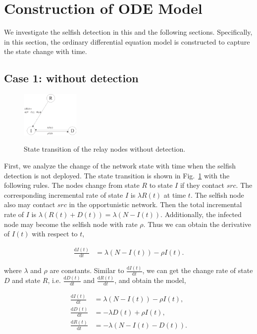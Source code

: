 \section{Construction of ODE Model}
\label{sec:wo_detect}
We investigate the selfish detection in this and the following sections.
Specifically, in this section, the ordinary differential equation model
is constructed to capture the state change with time.
\subsection{Case 1: without detection}
\label{subsec:wo_detc}
\begin{figure}
  \centering
  {\includegraphics[width=0.25\textwidth]
  {fig/state_transition_no_detect.eps}}
     \caption{State transition of the relay nodes without detection.}
     \label{fig:ss_wo_dt}
\end{figure}
First, we analyze the change of the network state with time
when the selfish detection is not deployed.
The state transition is shown
in Fig.~\ref{fig:ss_wo_dt} with the following rules.
The nodes change from state $R$ to state $I$ if they contact $src$.
The corresponding incremental rate of state $I$ is $\lambda R(t)$ at time $t$.
The selfish node also may contact $src$ in the opportunistic network.
Then the total incremental rate of $I$ is
$\lambda (R(t)+D(t))=\lambda (N-I(t))$.
Additionally, the infected node may become the selfish node with rate $\rho$.
Thus we can obtain the derivative of $I(t)$ with respect to $t$,
\begin{small}
\begin{equation}
\nonumber
\begin{aligned}
\frac{\mathrm{d} I(t)}{\mathrm{d} t} &= \lambda (N-I(t)) - \rho I(t).
\end{aligned}
\end{equation}
\end{small}
where $\lambda$ and $\rho$ are constants.
Similar to $\frac{\mathrm{d} I(t)}{\mathrm{d} t}$,
we can get the change rate of state $D$ and state $R$,
i.e. $\frac{\mathrm{d} D(t)}{\mathrm{d} t}$ and
$\frac{\mathrm{d} R(t)}{\mathrm{d} t}$,
and obtain the model,
\begin{small}
\begin{equation}
\label{eq:IDR_wo}
\begin{aligned}
\frac{\mathrm{d} I(t)}{\mathrm{d} t} &=  \lambda (N-I(t)) - \rho I(t),\\
\frac{\mathrm{d} D(t)}{\mathrm{d} t} &= - \lambda D(t) + \rho I(t),\\
\frac{\mathrm{d} R(t)}{\mathrm{d} t} &= - \lambda (N-I(t)-D(t)).
\end{aligned}
\end{equation}
\end{small}
